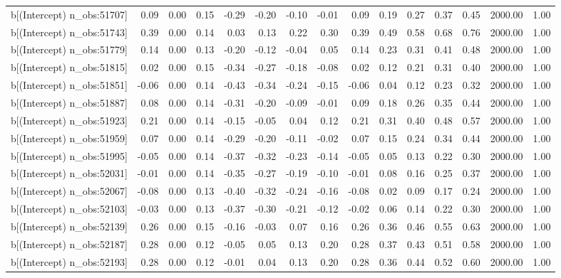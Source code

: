 \begin{table}[ht]
\begin{tabular}{rrrrrrrrrrrrrrr}
  b[(Intercept) n\_obs:51707] & 0.09 & 0.00 & 0.15 & -0.29 & -0.20 & -0.10 & -0.01 & 0.09 & 0.19 & 0.27 & 0.37 & 0.45 & 2000.00 & 1.00 \\ 
  b[(Intercept) n\_obs:51743] & 0.39 & 0.00 & 0.14 & 0.03 & 0.13 & 0.22 & 0.30 & 0.39 & 0.49 & 0.58 & 0.68 & 0.76 & 2000.00 & 1.00 \\ 
  b[(Intercept) n\_obs:51779] & 0.14 & 0.00 & 0.13 & -0.20 & -0.12 & -0.04 & 0.05 & 0.14 & 0.23 & 0.31 & 0.41 & 0.48 & 2000.00 & 1.00 \\ 
  b[(Intercept) n\_obs:51815] & 0.02 & 0.00 & 0.15 & -0.34 & -0.27 & -0.18 & -0.08 & 0.02 & 0.12 & 0.21 & 0.31 & 0.40 & 2000.00 & 1.00 \\ 
  b[(Intercept) n\_obs:51851] & -0.06 & 0.00 & 0.14 & -0.43 & -0.34 & -0.24 & -0.15 & -0.06 & 0.04 & 0.12 & 0.23 & 0.32 & 2000.00 & 1.00 \\ 
  b[(Intercept) n\_obs:51887] & 0.08 & 0.00 & 0.14 & -0.31 & -0.20 & -0.09 & -0.01 & 0.09 & 0.18 & 0.26 & 0.35 & 0.44 & 2000.00 & 1.00 \\ 
  b[(Intercept) n\_obs:51923] & 0.21 & 0.00 & 0.14 & -0.15 & -0.05 & 0.04 & 0.12 & 0.21 & 0.31 & 0.40 & 0.48 & 0.57 & 2000.00 & 1.00 \\ 
  b[(Intercept) n\_obs:51959] & 0.07 & 0.00 & 0.14 & -0.29 & -0.20 & -0.11 & -0.02 & 0.07 & 0.15 & 0.24 & 0.34 & 0.44 & 2000.00 & 1.00 \\ 
  b[(Intercept) n\_obs:51995] & -0.05 & 0.00 & 0.14 & -0.37 & -0.32 & -0.23 & -0.14 & -0.05 & 0.05 & 0.13 & 0.22 & 0.30 & 2000.00 & 1.00 \\ 
  b[(Intercept) n\_obs:52031] & -0.01 & 0.00 & 0.14 & -0.35 & -0.27 & -0.19 & -0.10 & -0.01 & 0.08 & 0.16 & 0.25 & 0.37 & 2000.00 & 1.00 \\ 
  b[(Intercept) n\_obs:52067] & -0.08 & 0.00 & 0.13 & -0.40 & -0.32 & -0.24 & -0.16 & -0.08 & 0.02 & 0.09 & 0.17 & 0.24 & 2000.00 & 1.00 \\ 
  b[(Intercept) n\_obs:52103] & -0.03 & 0.00 & 0.13 & -0.37 & -0.30 & -0.21 & -0.12 & -0.02 & 0.06 & 0.14 & 0.22 & 0.30 & 2000.00 & 1.00 \\ 
  b[(Intercept) n\_obs:52139] & 0.26 & 0.00 & 0.15 & -0.16 & -0.03 & 0.07 & 0.16 & 0.26 & 0.36 & 0.46 & 0.55 & 0.63 & 2000.00 & 1.00 \\ 
  b[(Intercept) n\_obs:52187] & 0.28 & 0.00 & 0.12 & -0.05 & 0.05 & 0.13 & 0.20 & 0.28 & 0.37 & 0.43 & 0.51 & 0.58 & 2000.00 & 1.00 \\ 
  b[(Intercept) n\_obs:52193] & 0.28 & 0.00 & 0.12 & -0.01 & 0.04 & 0.13 & 0.20 & 0.28 & 0.36 & 0.44 & 0.52 & 0.60 & 2000.00 & 1.00 \\ 

\end{tabular}
\end{table}
